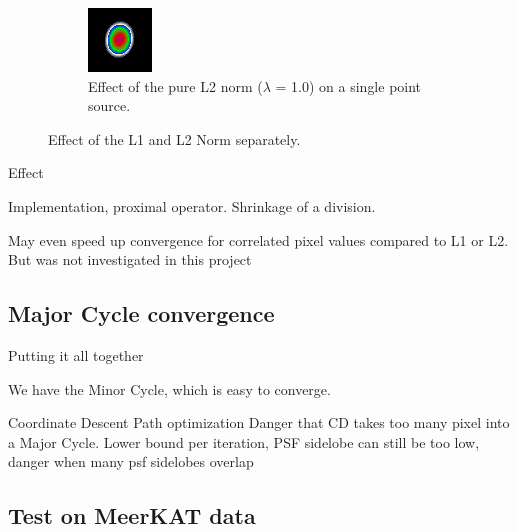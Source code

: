 \begin{figure}[h]
\begin{subfigure}[b]{0.3\linewidth}
		\includegraphics[width=\linewidth]{./chapters/03.distribution/L2.png}
		\caption{Effect of the pure L2 norm ($\lambda$ = 1.0) on a single point source.}
		\label{dist:cd:elastic:L2}
	\end{subfigure}
	
	\caption{Effect of the L1 and L2 Norm separately.}
	\label{dist:cd:elastic}
\end{figure}


Effect

Implementation, proximal operator. Shrinkage of a division.



May even speed up convergence for correlated pixel values compared to L1 or L2\cite{friedman2010regularization}. But was not investigated in this project

\subsection{Major Cycle convergence}
Putting it all together

We have the Minor Cycle, which is easy to converge.

Coordinate Descent Path optimization \cite{friedman2010regularization}
Danger that CD takes too many pixel into a Major Cycle. Lower bound per iteration, PSF sidelobe
  can still be too low, danger when many psf sidelobes overlap

\subsection{Test on MeerKAT data}

